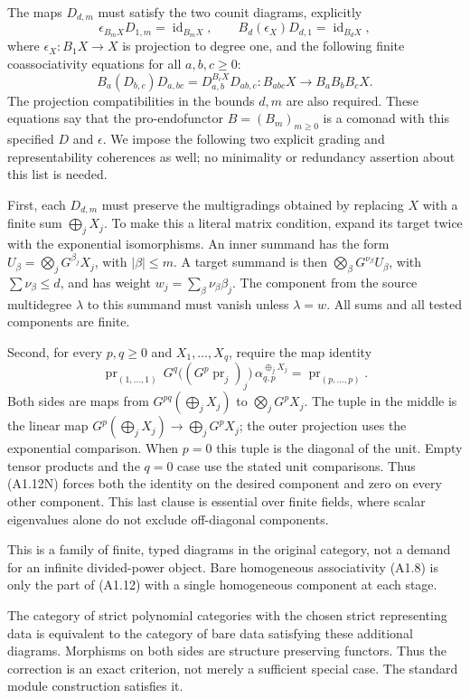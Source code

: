 The maps $D_{d,m}$ must satisfy the two counit diagrams, explicitly
\[
 \epsilon_{B_mX}D_{1,m}=\operatorname{id}_{B_mX},\qquad
 B_d(\epsilon_X)D_{d,1}=\operatorname{id}_{B_dX},
\]
where $\epsilon_X:B_1X\to X$ is projection to degree one, and the
following finite coassociativity equations for all $a,b,c\geq0$:
\[
 B_a(D_{b,c})D_{a,bc}
       =D_{a,b}^{B_cX}D_{ab,c}:
 B_{abc}X\longrightarrow B_aB_bB_cX.
 \tag{A1.12}
\]
The projection compatibilities in the bounds $d,m$ are also required.
These equations say that the pro-endofunctor $B=(B_m)_{m\geq0}$ is a
comonad with this specified $D$ and $\epsilon$. We impose the following
two explicit grading and representability coherences as well; no
minimality or redundancy assertion about this list is needed.

First, each $D_{d,m}$ must preserve the multigradings obtained by
replacing $X$ with a finite sum $\bigoplus_jX_j$. To make this a
literal matrix condition, expand its target twice with the exponential
isomorphisms. An inner summand has the form
$U_\beta=\bigotimes_jG^{\beta_j}X_j$, with $|\beta|\leq m$.
A target summand is then $\bigotimes_\beta G^{\nu_\beta}U_\beta$,
with $\sum\nu_\beta\leq d$, and has weight
$w_j=\sum_\beta\nu_\beta\beta_j$. The component from the source
multidegree $\lambda$ to this summand must vanish unless $\lambda=w$.
All sums and all tested components are finite.

Second, for every $p,q\geq0$ and $X_1,\ldots,X_q$, require the map
identity
\[
 \operatorname{pr}_{(1,\ldots,1)}\,
 G^q\bigl((G^p\operatorname{pr}_j)_j\bigr)\,
 \alpha_{q,p}^{\oplus_jX_j}
       =\operatorname{pr}_{(p,\ldots,p)}.
 \tag{A1.12N}
\]
Both sides are maps from $G^{pq}(\bigoplus_jX_j)$ to
$\bigotimes_jG^pX_j$. The tuple in the middle is the linear map
$G^p(\bigoplus_jX_j)\to\bigoplus_jG^pX_j$; the outer projection
uses the exponential comparison. When $p=0$ this tuple is the
diagonal of the unit. Empty tensor products and the $q=0$ case use
the stated unit comparisons. Thus (A1.12N) forces both the identity
on the desired component and zero on every other component. This
last clause is essential over finite fields, where scalar eigenvalues
alone do not exclude off-diagonal components.

This is a family of finite, typed diagrams in the original category,
not a demand for an infinite divided-power object. Bare homogeneous
associativity (A1.8) is only the part of (A1.12) with a single
homogeneous component at each stage.

The category of strict polynomial categories with the chosen strict
representing data is equivalent to the category of bare data satisfying
these additional diagrams. Morphisms on both sides are structure
preserving functors. Thus the correction is an exact criterion, not
merely a sufficient special case. The standard module construction
satisfies it.

